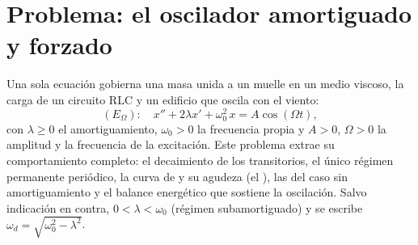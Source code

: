 \section{Problema: el oscilador amortiguado y forzado}

\begin{problem}\label{pb:b1:diffeq:1}
Una sola ecuación gobierna una masa unida a un muelle en un medio
viscoso, la carga de un circuito RLC y un edificio que oscila con el
viento:
\[
(E_\Omega)\colon\quad
x'' + 2\lambda x' + \omega_0^2\,x = A\cos(\Omega t),
\]
con $\lambda \geq 0$ el amortiguamiento, $\omega_0 > 0$ la frecuencia
propia y $A > 0$, $\Omega > 0$ la amplitud y la frecuencia de la
excitación. Este problema extrae su comportamiento completo: el
decaimiento de los transitorios, el único régimen permanente periódico,
la curva de  y su agudeza (el \emph{}),
las  del caso sin amortiguamiento y el balance energético
que sostiene la oscilación.
Salvo indicación en contra, $0 < \lambda < \omega_0$ (régimen
subamortiguado) y se escribe $\omega_d = \sqrt{\omega_0^2 - \lambda^2}$.


\end{problem}
